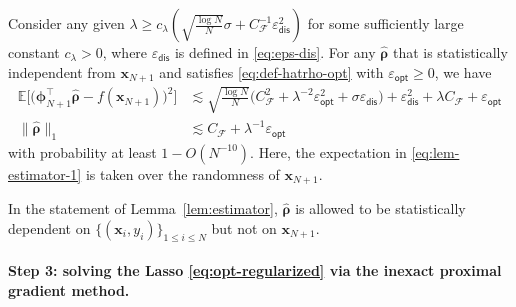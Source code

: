 \documentclass[english]{article}
\begin{document}
\begin{lemma} \label{lem:estimator}
Consider any given $\lambda \ge c_{\lambda}\left( \sqrt{\frac{\log N}{N}}\sigma + C_{\mathcal{F}}^{-1}\varepsilon_{\mathsf{dis}}^2\right)$ for some sufficiently large constant $c_{\lambda}>0$, where $\varepsilon_{\mathsf{dis}}$ is defined in \eqref{eq:eps-dis}. 
For any $\widehat{{\bm \rho}}$ that is statistically independent from $\bm{x}_{N+1}$ and satisfies \eqref{eq:def-hatrho-opt} with $\varepsilon_{\mathsf{opt}}\geq 0$, we have 
%
\begin{align}\label{eq:lem-estimator-1}
\mathbb{E}\Big[\big({\bm \phi}_{N+1}^{\top}\widehat{{\bm \rho}} - f({\bm x}_{N+1})\big)^2\Big]
&\lesssim \sqrt{\frac{\log N}{N}}\big(C_{\mathcal{F}}^2 + \lambda^{-2}\varepsilon_{\mathsf{opt}}^2 + \sigma\varepsilon_{\mathsf{dis}}\big) + \varepsilon_{\mathsf{dis}}^2 + \lambda C_{\mathcal{F}} + \varepsilon_{\mathsf{opt}} \\
 \label{eq:lem-estimator-2}
\|\widehat{{\bm \rho}}\|_1 &\lesssim C_{\mathcal{F}} + \lambda^{-1}\varepsilon_{\mathsf{opt}}
\end{align}
%
with probability at least $1-O(N^{-10})$. Here, the expectation in \eqref{eq:lem-estimator-1} is taken over the randomness of $\bm{x}_{N+1}$.
\end{lemma}
%
\begin{remark}
In the statement of Lemma~\ref{lem:estimator}, $\widehat{\bm{\rho}}$ is allowed to be statistically dependent on $\{(\bm{x}_i,y_i)\}_{1\leq i\leq N}$ but not on $\bm{x}_{N+1}$.  
\end{remark}





\paragraph{Step 3: solving the Lasso \eqref{eq:opt-regularized} via the inexact proximal gradient method.}


\end{document}
